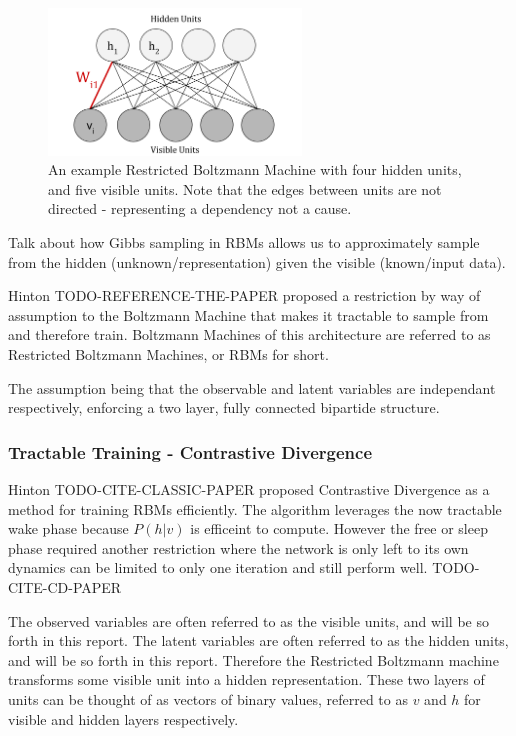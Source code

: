   \begin{figure}[h]
  \begin{center}
    \includegraphics[width = 0.6\textwidth]{Assets/RBM_Example.png}
  \caption{An example Restricted Boltzmann Machine with four hidden units, and five visible units. Note that the edges between units are not directed - representing a dependency not a cause. }
  \label{F:Restricted-Boltzmann-Machine}
  \end{center}
  \end{figure}


  \todo%
  Talk about how Gibbs sampling in RBMs allows us to approximately sample from the hidden (unknown/representation) given the visible (known/input data).
  \todo%

  Hinton TODO-REFERENCE-THE-PAPER proposed a restriction by way of assumption to the Boltzmann Machine that makes it tractable to sample from and therefore train. Boltzmann Machines of this architecture are referred to as Restricted Boltzmann Machines, or RBMs for short.

  The assumption being that the observable and latent variables are independant respectively, enforcing a two layer, fully connected bipartide structure.

    \subsubsection{Tractable Training - Contrastive Divergence}
    Hinton TODO-CITE-CLASSIC-PAPER proposed Contrastive Divergence as a method for training RBMs efficiently. The algorithm leverages the now tractable wake phase because $P(h|v)$ is efficeint to compute. However the free or sleep phase required another restriction where the network is only left to its own dynamics can be limited to only one iteration and still perform well. TODO-CITE-CD-PAPER

  The observed variables are often referred to as the visible units, and will be so forth in this report. The latent variables are often referred to as the hidden units, and will be so forth in this report. Therefore the Restricted Boltzmann machine transforms some visible unit into a hidden representation. These two layers of units can be thought of as vectors of binary values, referred to as $ v $ and $ h $ for visible and hidden layers respectively.

